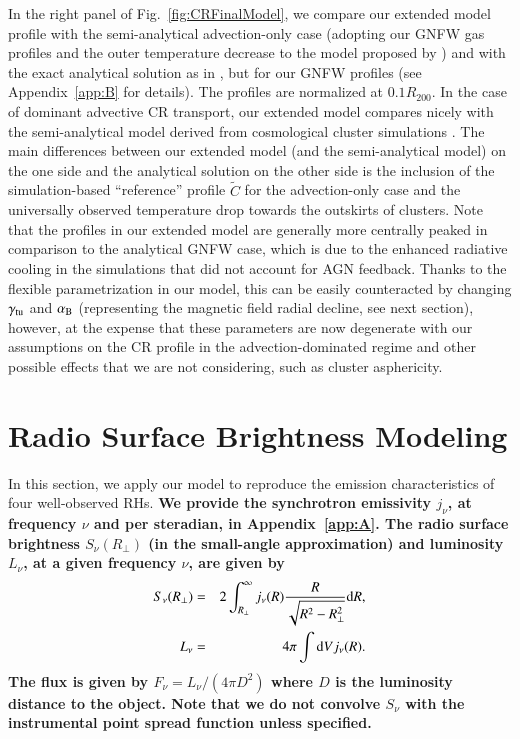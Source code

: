 \documentclass[useAMS,usenatbib]{mn2e}
\newcommand{\dd}{\mathrm{d}}
\begin{document}
In the right panel of Fig.~\ref{fig:CRFinalModel}, we compare our extended model
profile with the semi-analytical advection-only case (adopting our GNFW gas
profiles and the outer temperature decrease to the model proposed by
\citealp{2010MNRAS.409..449P}) and with the exact analytical solution as in
\citet{2011A&A...527A..99E}, but for our GNFW profiles (see Appendix~\ref{app:B}
for details).  The profiles are normalized at $0.1 R_{200}$. In the case of
dominant advective CR transport, our extended model compares nicely with the
semi-analytical model derived from cosmological cluster simulations
\citep{2010MNRAS.409..449P}.  The main differences between our extended model (and
the semi-analytical model) on the one side and the analytical solution on the
other side is the inclusion of the simulation-based ``reference'' profile
$\tilde{C}$ for the advection-only case and the universally observed temperature
drop towards the outskirts of clusters. Note that the profiles in our extended
model are generally more centrally peaked in comparison to the analytical GNFW
case, which is due to the enhanced radiative cooling in the
\citet{2010MNRAS.409..449P} simulations that did not account for AGN
feedback. Thanks to the flexible parametrization in our model, this can be
easily counteracted by changing $\gamma_{{\mathrm{tu}}}$ and $ \alpha_{{\mathrm{B}}}$ 
(representing the magnetic field radial decline, see next section), however, at
the expense that these parameters are now degenerate with our assumptions  on the
CR profile in the advection-dominated regime and other possible effects that we
are not considering, such as cluster asphericity.


\section{Radio Surface Brightness Modeling}
\label{sec:3}

In this section, we apply our model to reproduce the emission characteristics of
four well-observed RHs.
%
{\bf We provide the synchrotron emissivity $j_{\nu}$, at frequency $\nu$ and 
per steradian, in Appendix~\ref{app:A}.
% 
The radio surface brightness $S_{\nu}(R_{\perp})$ (in the small-angle approximation) and
luminosity $L_{\nu}$, at a given frequency $\nu$, are given by
\begin{eqnarray}
S_\nu(R_{\perp}) &=& 2 \int_{R_{\perp}}^{\infty} j_{\nu}(R) \frac{R}{\sqrt{R^{2}-R_{\perp}^{2}}} \rmn{d}R, \label{eq:surf} \\
L_{\nu}  &=&  4 \pi \int \dd V j_\nu(R).
\label{eq:lum}
\end{eqnarray}
The flux is given by $F_{\nu}=L_{\nu}/(4\pi D^{2})$ where $D$ is the luminosity
distance to the object. Note that we do not convolve $S_\nu$ with the instrumental
point spread function unless specified.}
\end{document}
